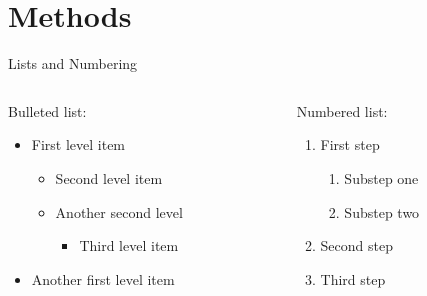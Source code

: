 \documentclass[aspectratio=169,xcolor=dvipsnames]{beamer}
\begin{document}
\section{Methods}
\begin{frame}{Lists and Numbering}
  \begin{columns}
    \begin{column}{0.48\textwidth}
      Bulleted list:
      \begin{itemize}
        \item First level item
        \begin{itemize}
          \item Second level item
          \item Another second level
          \begin{itemize}
            \item Third level item
          \end{itemize}
        \end{itemize}
        \item Another first level item
      \end{itemize}
    \end{column}
    \begin{column}{0.48\textwidth}
      Numbered list:
      \begin{enumerate}
        \item First step
        \begin{enumerate}
          \item Substep one
          \item Substep two
        \end{enumerate}
        \item Second step
        \item Third step
      \end{enumerate}
    \end{column}
  \end{columns}
\end{frame}
\end{document}
